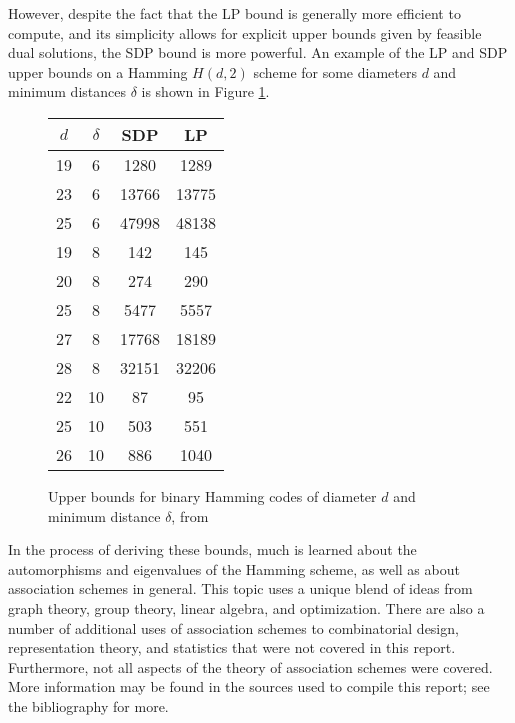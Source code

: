 \documentclass{report}
\begin{document}
  However, despite the fact that the LP bound is generally more efficient to
  compute, and its simplicity allows for explicit upper bounds given by feasible
  dual solutions, the SDP bound is more powerful.  An example of the LP and SDP
  upper bounds on a Hamming $H(d, 2)$ scheme for some diameters $d$ and minimum
  distances $\delta$ is shown in Figure \ref{fig:results}.

  \begin{figure}[h]
    \centering
    \begin{tabular}{|c|c|c|c|}
      \hline
      $d$ & $\delta$ & SDP   & LP \\
      \hline
      19  & 6        & 1280  & 1289 \\
      23  & 6        & 13766 & 13775 \\
      25  & 6        & 47998 & 48138 \\
      \hline
      19  & 8        & 142   & 145 \\
      20  & 8        & 274   & 290 \\
      25  & 8        & 5477  & 5557 \\
      27  & 8        & 17768 & 18189 \\
      28  & 8        & 32151 & 32206 \\
      \hline
      22  & 10       & 87    & 95 \\
      25  & 10       & 503   & 551 \\
      26  & 10       & 886   & 1040 \\
      \hline
    \end{tabular}
    \caption{Upper bounds for binary Hamming codes of diameter $d$ and minimum
      distance $\delta$, from \cite[Table~I]{schrijver}}
    \label{fig:results}
  \end{figure}

  In the process of deriving these bounds, much is learned about the
  automorphisms and eigenvalues of the Hamming scheme, as well as about
  association schemes in general.  This topic uses a unique blend of ideas from
  graph theory, group theory, linear algebra, and optimization.  There are also
  a number of additional uses of association schemes to combinatorial design,
  representation theory, and statistics that were not covered in this report.
  Furthermore, not all aspects of the theory of association schemes were
  covered.  More information may be found in the sources used to compile this
  report; see the bibliography for more.

\appendix
\end{document}
